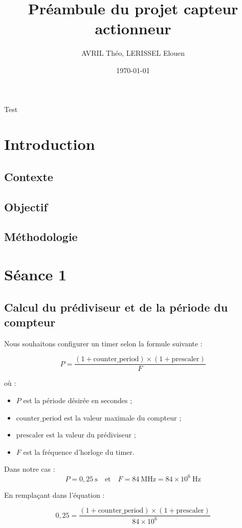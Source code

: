 \documentclass{article}
\title{Préambule du projet capteur actionneur}
\author{AVRIL Théo, LERISSEL Elouen}
\date{\today}
\begin{document}
    \maketitle
    Test
    \tableofcontents
    \section{Introduction}
    \subsection{Contexte}
    \subsection{Objectif}
    \subsection{Méthodologie}
    \section{Séance 1}

    \subsection*{Calcul du prédiviseur et de la période du compteur}

    Nous souhaitons configurer un timer selon la formule suivante :
    
    \[
    P = \frac{(1 + \text{counter\_period}) \times (1 + \text{prescaler})}{F}
    \]
    
    où :
    \begin{itemize}
        \item $P$ est la période désirée en secondes ;
        \item $\text{counter\_period}$ est la valeur maximale du compteur ;
        \item $\text{prescaler}$ est la valeur du prédiviseur ;
        \item $F$ est la fréquence d'horloge du timer.
    \end{itemize}
    
    Dans notre cas :
    \[
    P = 0{,}25~\text{s} \quad \text{et} \quad F = 84~\text{MHz} = 84 \times 10^6~\text{Hz}
    \]
    
    En remplaçant dans l’équation :
    
    \[
    0{,}25 = \frac{(1 + \text{counter\_period}) \times (1 + \text{prescaler})}{84 \times 10^6}
    \]
    
\end{document}

